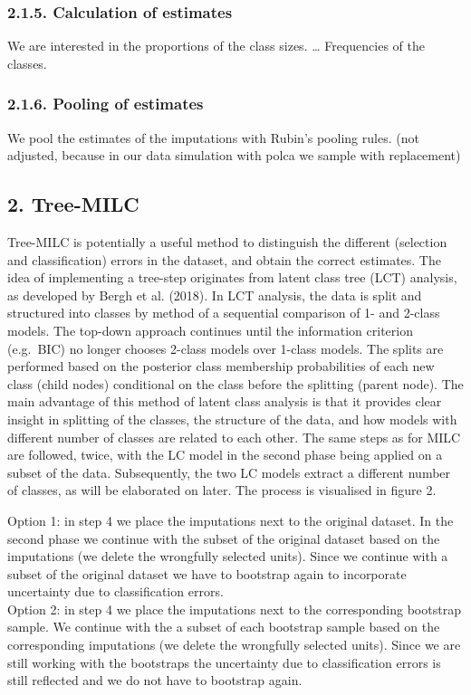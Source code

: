 \documentclass[
]{article}
\begin{document}
\hypertarget{calculation-of-estimates}{%
\subsubsection{2.1.5. Calculation of
estimates}\label{calculation-of-estimates}}

We are interested in the proportions of the class sizes. \ldots{}
Frequencies of the classes.

\hypertarget{pooling-of-estimates}{%
\subsubsection{2.1.6. Pooling of estimates}\label{pooling-of-estimates}}

We pool the estimates of the imputations with Rubin's pooling rules.
(not adjusted, because in our data simulation with polca we sample with
replacement)

\hypertarget{tree-milc}{%
\subsection{2. Tree-MILC}\label{tree-milc}}

Tree-MILC is potentially a useful method to distinguish the different
(selection and classification) errors in the dataset, and obtain the
correct estimates. The idea of implementing a tree-step originates from
latent class tree (LCT) analysis, as developed by Bergh et al. (2018).
In LCT analysis, the data is split and structured into classes by method
of a sequential comparison of 1- and 2-class models. The top-down
approach continues until the information criterion (e.g.~BIC) no longer
chooses 2-class models over 1-class models. The splits are performed
based on the posterior class membership probabilities of each new class
(child nodes) conditional on the class before the splitting (parent
node). The main advantage of this method of latent class analysis is
that it provides clear insight in splitting of the classes, the
structure of the data, and how models with different number of classes
are related to each other. The same steps as for MILC are followed,
twice, with the LC model in the second phase being applied on a subset
of the data. Subsequently, the two LC models extract a different number
of classes, as will be elaborated on later. The process is visualised in
figure 2.

Option 1: in step 4 we place the imputations next to the original
dataset. In the second phase we continue with the subset of the original
dataset based on the imputations (we delete the wrongfully selected
units). Since we continue with a subset of the original dataset we have
to bootstrap again to incorporate uncertainty due to classification
errors.\\
Option 2: in step 4 we place the imputations next to the corresponding
bootstrap sample. We continue with the a subset of each bootstrap sample
based on the corresponding imputations (we delete the wrongfully
selected units). Since we are still working with the bootstraps the
uncertainty due to classification errors is still reflected and we do
not have to bootstrap again.
\end{document}
